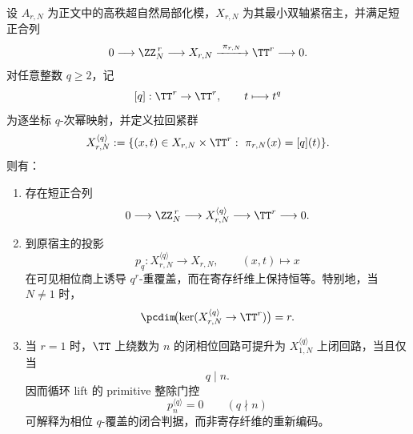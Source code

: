 \begin{theorem}\label{thm:conclusion-localized-host-phase-q-pullback}
设 \(A_{r,N}\) 为正文中的高秩超自然局部化模，\(X_{r,N}\) 为其最小双轴紧宿主，并满足短正合列
\[
0\longrightarrow \ZZ_N^{\,r}\longrightarrow X_{r,N}\xrightarrow{\ \pi_{r,N}\ }\TT^r\longrightarrow 0.
\]
对任意整数 \(q\ge 2\)，记
\[
[q]:\TT^r\to\TT^r,\qquad t\longmapsto t^q
\]
为逐坐标 \(q\)-次幂映射，并定义拉回紧群
\[
X_{r,N}^{\langle q\rangle}
:=
\{(x,t)\in X_{r,N}\times\TT^r:\ \pi_{r,N}(x)=[q](t)\}.
\]
则有：
\begin{enumerate}
  \item 存在短正合列
  \[
  0\longrightarrow \ZZ_N^{\,r}\longrightarrow X_{r,N}^{\langle q\rangle}\longrightarrow \TT^r\longrightarrow 0.
  \]
  \item 到原宿主的投影
  \[
  p_q:X_{r,N}^{\langle q\rangle}\to X_{r,N},\qquad (x,t)\mapsto x
  \]
  在可见相位商上诱导 \(q^r\)-重覆盖，而在寄存纤维上保持恒等。特别地，当 \(N\neq 1\) 时，
  \[
  \pcdim\!\bigl(\ker(X_{r,N}^{\langle q\rangle}\to \TT^r)\bigr)=r.
  \]
  \item 当 \(r=1\) 时，\(\TT\) 上绕数为 \(n\) 的闭相位回路可提升为 \(X_{1,N}^{\langle q\rangle}\) 上闭回路，当且仅当
  \[
  q\mid n.
  \]
  因而循环 lift 的 primitive 整除门控
  \[
  p_n^{\langle q\rangle}=0\qquad (q\nmid n)
  \]
  可解释为相位 \(q\)-覆盖的闭合判据，而非寄存纤维的重新编码。
\end{enumerate}
\end{theorem}
